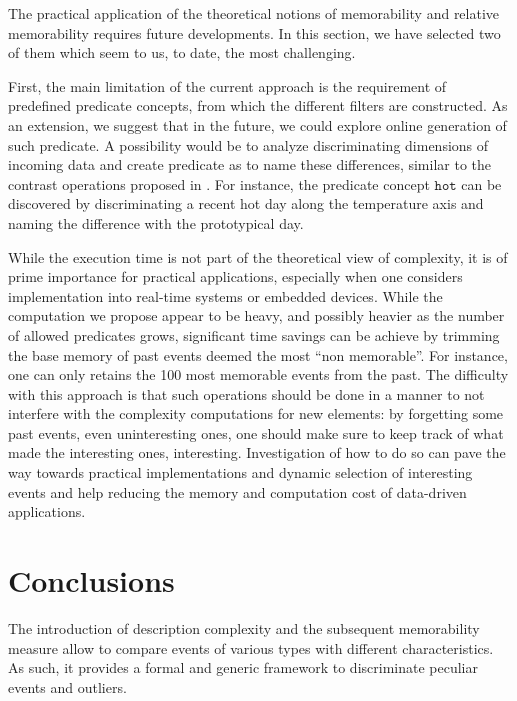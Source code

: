 \documentclass[entropy,article,submit,moreauthors,pdftex]{Definitions/mdpi}
\begin{document}
The practical application of the theoretical notions of memorability and relative memorability requires future developments. In this section, we have selected two of them which seem to us, to date, the most challenging.


First, the main limitation of the current approach is the requirement of
predefined predicate concepts, from which the different filters are constructed.
As an extension, we suggest that in the future, we could explore online
generation of such predicate. A possibility would be to analyze discriminating
dimensions of incoming data and create predicate as to name these differences,
similar to the contrast operations proposed in \cite{dessalles_conceptual_2015,
    gardenfors2004conceptual}. For instance, the predicate concept $\mathtt{hot}$
can be discovered by discriminating a recent hot day along the
temperature axis and naming the difference with the prototypical day.


While the execution time is not part of the theoretical view of complexity, it
is of prime importance for practical applications, especially when one considers
implementation into real-time systems or embedded devices. While the computation
we propose appear to be heavy, and possibly heavier as the number of allowed
predicates grows, significant time savings can be achieve by trimming the base
memory of past events deemed the most ``non memorable''. For instance, one can
only retains the 100 most memorable events from the past. The difficulty with
this approach is that such operations should be done in a manner to not
interfere with the complexity computations for new elements: by forgetting some
past events, even uninteresting ones, one should make sure to keep track of what
made the interesting ones, interesting. Investigation of how to do so can pave
the way towards practical implementations and dynamic selection of interesting
events and help reducing the memory and computation cost of data-driven applications.


\section{Conclusions}
The introduction of description complexity and the subsequent memorability measure allow to compare events of various types with different characteristics. As such, it provides a formal and generic framework to discriminate peculiar events and outliers.
\end{document}
